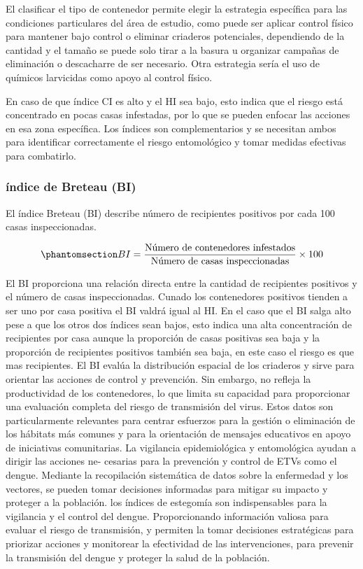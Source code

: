 \documentclass[
  letterpaper,
  twocolumn,
  landscape]{report}
\begin{document}
El clasificar el tipo de contenedor permite elegir la estrategia
específica para las condiciones particulares del área de estudio, como
puede ser aplicar control físico para mantener bajo control o eliminar
criaderos potenciales, dependiendo de la cantidad y el tamaño se puede
solo tirar a la basura u organizar campañas de eliminación o descacharre
de ser necesario. Otra estrategia sería el uso de químicos larvicidas
como apoyo al control físico.

En caso de que índice CI es alto y el HI sea bajo, esto indica que el
riesgo está concentrado en pocas casas infestadas, por lo que se pueden
enfocar las acciones en esa zona específica. Los índices son
complementarios y se necesitan ambos para identificar correctamente el
riesgo entomológico y tomar medidas efectivas para combatirlo.

\subsubsection*{índice de Breteau (BI)}\label{uxedndice-de-breteau-bi}

El índice Breteau (BI) describe número de recipientes positivos por cada
100 casas inspeccionadas.

\begin{equation}\phantomsection\label{eq-bi-index}{         
  BI = \frac{
   \text{Número de contenedores infestados}
  }{
    \text{Número de casas inspeccionadas}
  } \times 100
}\end{equation}

El BI proporciona una relación directa entre la cantidad de recipientes
positivos y el número de casas inspeccionadas. Cunado los contenedores
positivos tienden a ser uno por casa positiva el BI valdrá igual al HI.
En el caso que el BI salga alto pese a que los otros dos índices sean
bajos, esto indica una alta concentración de recipientes por casa aunque
la proporción de casas positivas sea baja y la proporción de recipientes
positivos también sea baja, en este caso el riesgo es que mas
recipientes. El BI evalúa la distribución espacial de los criaderos y
sirve para orientar las acciones de control y prevención. Sin embargo,
no refleja la productividad de los contenedores, lo que limita su
capacidad para proporcionar una evaluación completa del riesgo de
transmisión del virus. Estos datos son particularmente relevantes para
centrar esfuerzos para la gestión o eliminación de los hábitats más
comunes y para la orientación de mensajes educativos en apoyo de
iniciativas comunitarias. La vigilancia epidemiológica y entomológica
ayudan a dirigir las acciones ne- cesarias para la prevención y control
de ETVs como el dengue. Mediante la recopilación sistemática de datos
sobre la enfermedad y los vectores, se pueden tomar decisiones
informadas para mitigar su impacto y proteger a la población. los
índices de estegomía son indispensables para la vigilancia y el control
del dengue. Proporcionando información valiosa para evaluar el riesgo de
transmisión, y permiten la tomar decisiones estratégicas para priorizar
acciones y monitorear la efectividad de las intervenciones, para
prevenir la transmisión del dengue y proteger la salud de la población.
\end{document}
